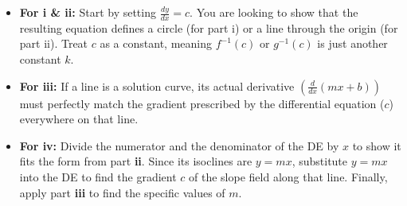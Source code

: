 \begin{hint}
\begin{itemize}
    \item \textbf{For i \& ii:} Start by setting $\frac{dy}{dx} = c$. You are looking to show that the resulting equation defines a circle (for part i) or a line through the origin (for part ii). Treat $c$ as a constant, meaning $f^{-1}(c)$ or $g^{-1}(c)$ is just another constant $k$.
    \item \textbf{For iii:} If a line is a solution curve, its actual derivative $\left(\frac{d}{dx}(mx+b)\right)$ must perfectly match the gradient prescribed by the differential equation ($c$) everywhere on that line.
    \item \textbf{For iv:} Divide the numerator and the denominator of the DE by $x$ to show it fits the form from part \textbf{ii}. Since its isoclines are $y=mx$, substitute $y=mx$ into the DE to find the gradient $c$ of the slope field along that line. Finally, apply part \textbf{iii} to find the specific values of $m$.
\end{itemize}
\end{hint}

